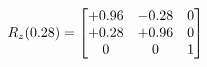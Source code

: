 \documentclass[preview]{standalone}
\begin{document}
\begin{align*}
\special{dvisvgm:raw <g id='unique000'>}R_{z}(0.28) = \begin{bmatrix}+0.96 & -0.28 & 0 \\+0.28 & +0.96 & 0 \\0 & 0 & 1\end{bmatrix}\special{dvisvgm:raw </g>}
\end{align*}
\end{document}

